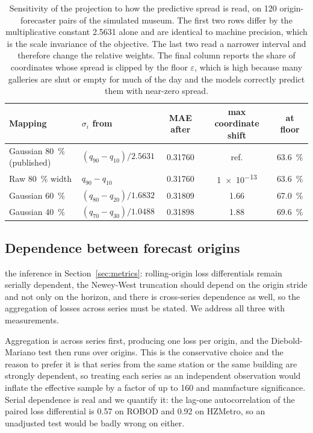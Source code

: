 \documentclass[utf8]{FrontiersinHarvard}
\newif\ifrevisionmarkup
\newcommand{\new}[1]{\ifrevisionmarkup\textcolor{revision}{#1}\else#1\fi}
\newif\ifsecondrevisionmarkup
\newcommand{\rev}[1]{\ifsecondrevisionmarkup\textcolor{revisiontwo}{#1}\else#1\fi}
\theoremstyle{plain}
\theoremstyle{definition}
\theoremstyle{remark}
\begin{document}
\new{\begin{table}[htbp]
\centering
\caption{\new{Sensitivity of the projection to how the predictive spread is read, on \num{120} origin-forecaster pairs of the simulated museum. The first two rows differ by the multiplicative constant \num{2.5631} alone and are identical to machine precision, which is the scale invariance of the objective. The last two read a narrower interval and therefore change the relative weights. The final column reports the share of coordinates whose spread is clipped by the floor $\varepsilon$, which is high because many galleries are shut or empty for much of the day and the models correctly predict them with near-zero spread.}}
\label{tab:sigma}
\small
\begin{tabular}{llccc}
\toprule
Mapping & $\sigma_i$ from & MAE after & max coordinate shift & at floor \\
\midrule
Gaussian \SI{80}{\percent} (published) & $(q_{90}-q_{10})/2.5631$ & 0.31760 & ref. & \SI{63.6}{\percent} \\
Raw \SI{80}{\percent} width             & $q_{90}-q_{10}$          & 0.31760 & \num{1e-13} & \SI{63.6}{\percent} \\
Gaussian \SI{60}{\percent}              & $(q_{80}-q_{20})/1.6832$ & 0.31809 & 1.66 & \SI{67.0}{\percent} \\
Gaussian \SI{40}{\percent}              & $(q_{70}-q_{30})/1.0488$ & 0.31898 & 1.88 & \SI{69.6}{\percent} \\
\bottomrule
\end{tabular}
\end{table}}

\subsection{\new{Dependence between forecast origins}}
\label{sec:depend}

\new{ the inference in Section~\ref{sec:metrics}: \rev{rolling-origin loss differentials remain serially dependent, the Newey-West truncation should depend on the origin stride and not only on the horizon, and there is cross-series dependence as well, so the aggregation of losses across series must be stated. We address all three with measurements.}}

\new{Aggregation is across series first, producing one loss per origin, and the Diebold-Mariano test then runs over origins. This is the conservative choice and the reason to prefer it is that series from the same station or the same building are strongly dependent, so treating each series as an independent observation would inflate the effective sample by a factor of up to \num{160} and manufacture significance. Serial dependence is real and we quantify it: the lag-one autocorrelation of the paired loss differential is \num{0.57} on ROBOD and \num{0.92} on HZMetro, so an unadjusted test would be badly wrong on either.}
\end{document}

